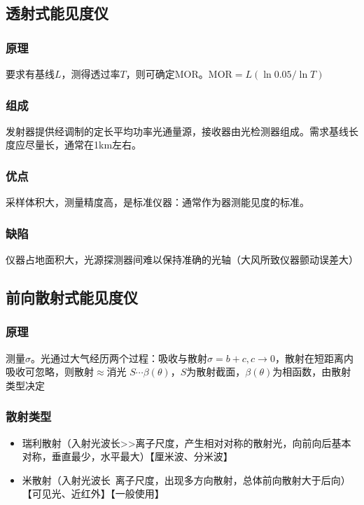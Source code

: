 \documentclass[UTF8,11pt]{ctexbook}
\begin{document}
\subsection{透射式能见度仪}

\subsubsection{原理}

要求有基线\(L\)，测得透过率\(T\)，则可确定MOR。\(\mathrm{MOR}=L(\ln0.05/\ln T)\)

\subsubsection{组成}

发射器提供经调制的定长平均功率光通量源，接收器由光检测器组成。需求基线长度应尽量长，通常在1km左右。
	
\subsubsection{优点}

采样体积大，测量精度高，是标准仪器：通常作为器测能见度的标准。

\subsubsection{缺陷}

仪器占地面积大，光源探测器间难以保持准确的光轴（大风所致仪器颤动误差大）

\subsection{前向散射式能见度仪}

\subsubsection{原理}

测量\(\sigma\)。光通过大气经历两个过程：吸收与散射\(\sigma=b+c,c\rightarrow0\)，散射在短距离内吸收可忽略，则散射\(\approx\)消光 
\(S\cdots \beta(\theta)\)，\(S\)为散射截面，\(\beta(\theta)\)为相函数，由散射类型决定

\subsubsection{散射类型}
\begin{itemize}
    \item 瑞利散射（入射光波长>>离子尺度，产生相对对称的散射光，向前向后基本对称，垂直最少，水平最大）【厘米波、分米波】
    \item 米散射（入射光波长~离子尺度，出现多方向散射，总体前向散射大于后向）【可见光、近红外】【一般使用】
\end{itemize}
\end{document}
